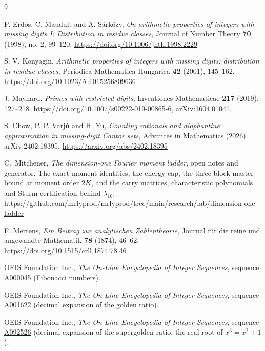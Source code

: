 \documentclass[11pt]{amsart}
\theoremstyle{definition}
\theoremstyle{remark}
\begin{document}
\begin{thebibliography}{9}

P. Erd\H{o}s, C. Mauduit and A. S\'ark\"ozy, \emph{On arithmetic properties of integers with missing digits I: Distribution in residue classes}, Journal of Number Theory \textbf{70} (1998), no. 2, 99--120. \url{https://doi.org/10.1006/jnth.1998.2229}

S. V. Konyagin, \emph{Arithmetic properties of integers with missing digits: distribution in residue classes}, Periodica Mathematica Hungarica \textbf{42} (2001), 145--162. \url{https://doi.org/10.1023/A:1015256809636}

J. Maynard, \emph{Primes with restricted digits}, Inventiones Mathematicae \textbf{217} (2019), 127--218. \url{https://doi.org/10.1007/s00222-019-00865-6}, arXiv:1604.01041.

S. Chow, P. P. Varj\'u and H. Yu, \emph{Counting rationals and diophantine approximation in missing-digit Cantor sets}, Advances in Mathematics (2026). arXiv:2402.18395, \url{https://arxiv.org/abs/2402.18395}

C.~Mitchener, \emph{The dimension-one Fourier moment ladder}, open notes and generator. The exact moment identities, the energy cap, the three-block master bound at moment order $2K$, and the carry matrices, characteristic polynomials and Sturm certification behind $\lambda_{10}$. \url{https://github.com/mrlyprod/mrlyprod/tree/main/research/lab/dimension-one-ladder}

F. Mertens, \emph{Ein Beitrag zur analytischen Zahlentheorie}, Journal f\"ur die reine und angewandte Mathematik \textbf{78} (1874), 46--62. \url{https://doi.org/10.1515/crll.1874.78.46}

OEIS Foundation Inc., \emph{The On-Line Encyclopedia of Integer Sequences}, sequence \href{https://oeis.org/A000045}{A000045} (Fibonacci numbers).

OEIS Foundation Inc., \emph{The On-Line Encyclopedia of Integer Sequences}, sequence \href{https://oeis.org/A001622}{A001622} (decimal expansion of the golden ratio).

OEIS Foundation Inc., \emph{The On-Line Encyclopedia of Integer Sequences}, sequence \href{https://oeis.org/A092526}{A092526} (decimal expansion of the supergolden ratio, the real root of $x^3 = x^2 + 1$).

\end{thebibliography}
\end{document}
